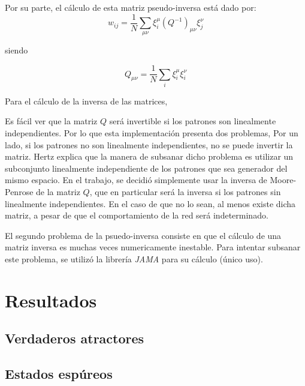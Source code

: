 \documentclass[%
    final,
    reprint,
    notitlepage,
    narroweqnarray,
    inline,
    twoside,
    invited
    ]{ieee}
\begin{document}
\par Por su parte, el cálculo de esta matriz pseudo-inversa está dado por:\\

\begin{equation}
w_{ij}=\frac{1}{N}\sum_{\mu \nu} \xi_i^{\mu}(Q^{-1})_{\mu \nu}  \xi_j^{\nu}
\end{equation}

siendo 

\begin{equation}
Q_{\mu \nu} = \frac{1}{N}\sum_{i}  \xi_i^{\mu}  \xi_i^{\nu}
\end{equation}


\par Para el cálculo de la inversa de las matrices, \\

\par Es fácil ver que la matriz $Q$ será invertible si los patrones son linealmente independientes. 
Por lo que esta implementación presenta dos problemas, Por un lado, si los patrones no son 
linealmente independientes, no se puede invertir la matriz. Hertz explica que la manera de subsanar 
dicho problema es utilizar un subconjunto linealmente independiente de los patrones que sea generador 
del mismo espacio. En el trabajo, se decidió simplemente usar la inversa de Moore-Penrose de la matriz $Q$, 
que en particular será la inversa si los patrones sin linealmente independientes. En el caso de que no lo sean, 
al menos existe dicha matriz, a pesar de que el comportamiento de la red será indeterminado.

\par El segundo problema de la psuedo-inversa consiste en que el cálculo de una matriz inversa 
es muchas veces numericamente inestable. Para intentar subsanar este problema, se utilizó la librería \textit{JAMA} 
para su cálculo (único uso).



\section{Resultados}

\subsection{Verdaderos atractores} 

\subsection{Estados espúreos}
\end{document}
